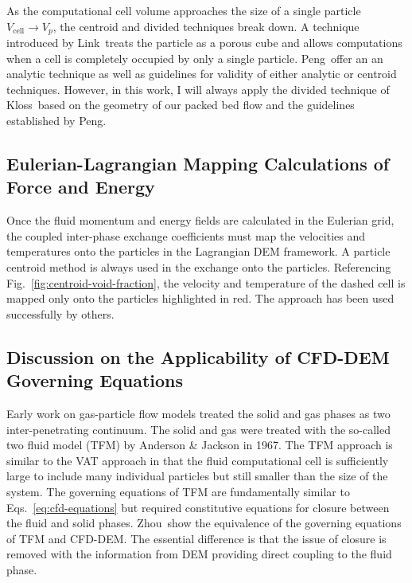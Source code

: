 As the computational cell volume approaches the size of a single particle $V_\text{cell}\rightarrow V_p$, the centroid and divided techniques break down. A technique introduced by Link\etal~treats the particle as a porous cube and allows computations when a cell is completely occupied by only a single particle.\cite{Link2005} Peng\etal~offer an an analytic technique as well as guidelines for validity of either analytic or centroid techniques.\cite{Peng2014} However, in this work, I will always apply the divided technique of Kloss\etal~based on the geometry of our packed bed flow and the guidelines established by Peng\etal.\cite{Kloss2012,Peng2014}


\subsection{Eulerian-Lagrangian Mapping Calculations of Force and Energy}
Once the fluid momentum and energy fields are calculated in the Eulerian grid, the coupled inter-phase exchange coefficients must map the velocities and temperatures onto the particles in the Lagrangian DEM framework. A particle centroid method is always used in the exchange onto the particles. Referencing Fig.~\ref{fig:centroid-void-fraction}, the velocity and temperature of the dashed cell is mapped only onto the particles highlighted in red. The approach has been used successfully by others.\cite{Xu1997,Link2005,Kloss2012}







\subsection{Discussion on the Applicability of CFD-DEM Governing Equations}
Early work on gas-particle flow models treated the solid and gas phases as two inter-penetrating continuum. The solid and gas were treated with the so-called two fluid model (TFM) by Anderson \& Jackson in 1967.\cite{Anderson1967} The TFM approach is similar to the VAT approach in that the fluid computational cell is sufficiently large to include many individual particles but still smaller than the size of the system.\cite{Enwald1996} The governing equations of TFM are fundamentally similar to Eqs.~\ref{eq:cfd-equations} but required constitutive equations for closure between the fluid and solid phases. Zhou\etal~show the equivalence of the governing equations of TFM and CFD-DEM.\cite{Zhou2010} The essential difference is that the issue of closure is removed with the information from DEM providing direct coupling to the fluid phase.

